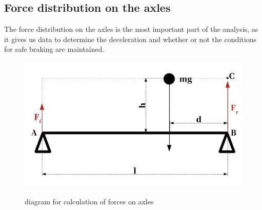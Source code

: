 \documentclass[12pt]{article}
\begin{document}
\begin{figure}[h]
\begin{subfigure}[b]{0.4\linewidth}
\caption{}
\label{fig:beam_diagram}%
\end{subfigure}
\label{fig:theoretical_models}%
\end{figure}

\newpage

\subsection{Force distribution on the axles}
The force distribution on the axles is the most important part of the analysis, as it gives us data to 
determine the deceleration and whether or not the conditions for safe braking are maintained.
\begin{figure}[H]
\caption{diagram for calculation of forces on axles}
\includegraphics[width=\linewidth]{static_forces_simplified}
\label{fig:static_diagram}%
\end{figure}
\end{document}
